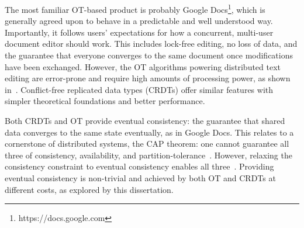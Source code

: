 \documentclass[12pt,a4paper,twoside,openright]{report}
\begin{document}
The most familiar OT-based product is probably Google Docs\footnote{https://docs.google.com}, which is generally agreed upon to behave in a predictable and well understood way. Importantly, it follows users' expectations for how a concurrent, multi-user document editor should work. This includes lock-free editing, no loss of data, and the guarantee that everyone converges to the same document once modifications have been exchanged. However, the OT algorithms powering distributed text editing are error-prone and require high amounts of processing power, as shown in~\cite{dang2016performance}. Conflict-free replicated data types (CRDTs) offer similar features with simpler theoretical foundations and better performance.

Both CRDTs and OT provide eventual consistency: the guarantee that shared data converges to the same state eventually, as in Google Docs. This relates to a cornerstone of distributed systems, the CAP theorem: one cannot guarantee all three of consistency, availability, and partition-tolerance~\cite{Gilbert2005}. However, relaxing the consistency constraint to eventual consistency enables all three~\cite{zeller2014}. Providing eventual consistency is non-trivial and achieved by both OT and CRDTs at different costs, as explored by this dissertation.





\end{document}
